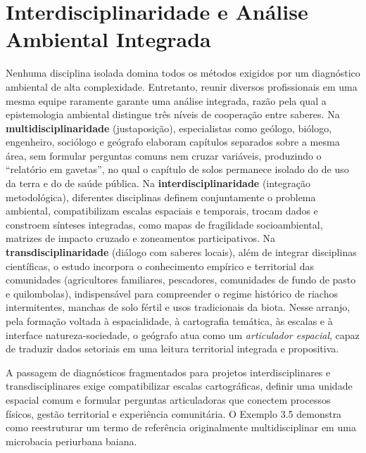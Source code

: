 \section{Interdisciplinaridade e Análise Ambiental Integrada}

Nenhuma disciplina isolada domina todos os métodos exigidos por um diagnóstico ambiental de alta complexidade. Entretanto, reunir diversos profissionais em uma mesma equipe raramente garante uma análise integrada, razão pela qual a epistemologia ambiental distingue três níveis de cooperação entre saberes. Na \textbf{multidisciplinaridade} (justaposição), especialistas como geólogo, biólogo, engenheiro, sociólogo e geógrafo elaboram capítulos separados sobre a mesma área, sem formular perguntas comuns nem cruzar variáveis, produzindo o ``relatório em gavetas'', no qual o capítulo de solos permanece isolado do de uso da terra e do de saúde pública. Na \textbf{interdisciplinaridade} (integração metodológica), diferentes disciplinas definem conjuntamente o problema ambiental, compatibilizam escalas espaciais e temporais, trocam dados e constroem sínteses integradas, como mapas de fragilidade socioambiental, matrizes de impacto cruzado e zoneamentos participativos. Na \textbf{transdisciplinaridade} (diálogo com saberes locais), além de integrar disciplinas científicas, o estudo incorpora o conhecimento empírico e territorial das comunidades (agricultores familiares, pescadores, comunidades de fundo de pasto e quilombolas), indispensável para compreender o regime histórico de riachos intermitentes, manchas de solo fértil e usos tradicionais da biota. Nesse arranjo, pela formação voltada à espacialidade, à cartografia temática, às escalas e à interface natureza-sociedade, o geógrafo atua como um \textit{articulador espacial}, capaz de traduzir dados setoriais em uma leitura territorial integrada e propositiva.


A passagem de diagnósticos fragmentados para projetos interdisciplinares e transdisciplinares exige compatibilizar escalas cartográficas, definir uma unidade espacial comum e formular perguntas articuladoras que conectem processos físicos, gestão territorial e experiência comunitária. O Exemplo 3.5 demonstra como reestruturar um termo de referência originalmente multidisciplinar em uma microbacia periurbana baiana.

